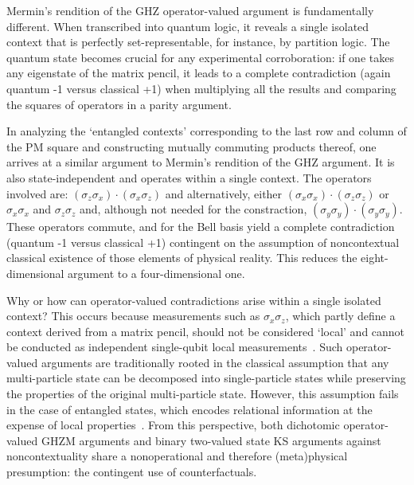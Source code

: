 \documentclass[
  twocolumn,
 showpacs,
 showkeys,
 preprintnumbers,
 amsmath,amssymb,
 aps,
 pra,
  longbibliography,
 floatfix,
 ]{revtex4-2}
\newcommand\myotimes{ }
\begin{document}
Mermin's rendition of the GHZ operator-valued argument is fundamentally different. When transcribed into quantum logic, it reveals a single isolated context that is perfectly set-representable, for instance, by partition logic. The quantum state becomes crucial for any experimental corroboration: if one takes any eigenstate of the matrix pencil, it leads to a complete contradiction (again quantum -1 versus classical +1) when multiplying all the results and comparing the squares of operators in a parity argument.

In analyzing the `entangled contexts' corresponding to the last row and column of the PM square and constructing
mutually commuting products thereof, one arrives at a similar argument to Mermin's rendition of the GHZ argument.
It is also state-independent and operates within a single context. The operators involved are:
$
(\sigma_z \myotimes \sigma_x) \cdot (\sigma_x \myotimes \sigma_z)
$  and alternatively, either
$
(\sigma_x\myotimes \sigma_x) \cdot (\sigma_z\myotimes \sigma_z)
$
or
$
\sigma_x\myotimes \sigma_x
$
and
$\sigma_z\myotimes \sigma_z
$
and, although not needed for the constraction,
$(\sigma_y \myotimes \sigma_y) \cdot (\sigma_y\myotimes \sigma_y)$.
These operators commute, and for the Bell basis yield a complete contradiction (quantum -1 versus classical +1)
contingent on the assumption of noncontextual classical existence of those elements of physical reality.
This reduces the eight-dimensional argument to a four-dimensional one.


Why or how can operator-valued contradictions arise within a single isolated context?
This occurs because measurements such as \(\sigma_x \myotimes \sigma_z \),
which partly define a context derived from a matrix pencil,
should not be considered `local' and cannot be conducted as independent single-qubit local measurements~\cite{cabello2021contextuality}.
Such operator-valued arguments are traditionally rooted in the classical assumption that any multi-particle state
can be decomposed into single-particle states while preserving the properties of the original multi-particle state.
However, this assumption fails in the case of entangled states,
which encodes relational information at the expense of local properties~\cite{zeil-99}.
From this perspective, both dichotomic operator-valued GHZM
arguments and binary two-valued state KS arguments against noncontextuality share a nonoperational and therefore
(meta)physical presumption: the contingent use of counterfactuals.
\end{document}
